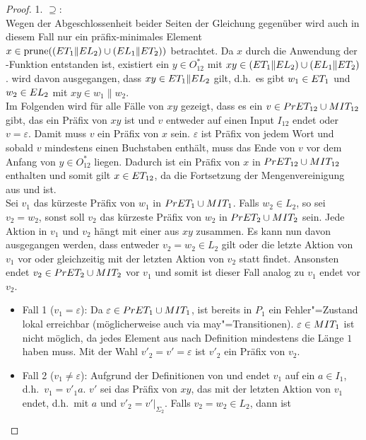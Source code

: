 \begin{proof}
  1. \glqq$\supseteq$\grqq{}:\\
  Wegen der Abgeschlossenheit beider Seiten der Gleichung gegenüber \cont{}
  wird auch in diesem Fall nur ein präfix-minimales Element $x\in\mathrm{prune} ((ET
  _1\|EL _2)\cup (EL _1\| ET _2))$ betrachtet. Da $x$ durch die Anwendung
  der \prune{}-Funktion entstanden ist, existiert ein $y\in O_{12} ^*$ mit
  $xy\in (ET _1\|EL _2)\cup (EL _1\| ET _2)$. \OBdA{} wird davon
  ausgegangen, dass $xy\in ET _1\| EL _2$ gilt, d.h.\ es gibt $w_1\in ET _1$
  und $w_2\in EL _2$ mit $xy \in w_1\| w_2$.\\
  Im Folgenden wird für alle Fälle von $xy$ gezeigt, dass es ein $v\in PrET
  _{12} \cup MIT _{12}$ gibt, das ein Präfix von $xy$ ist und $v$ entweder auf
  einen Input $I_{12}$ endet oder $v=\varepsilon$. Damit muss $v$ ein Präfix
  von $x$ sein. $\varepsilon$ ist Präfix von jedem Wort und sobald $v$
  mindestens einen Buchstaben enthält, muss das Ende von $v$ vor dem Anfang von
  $y\in O_{12}^*$ liegen. Dadurch ist ein Präfix von $x$ in $PrET _{12}\cup
  MIT _{12}$ enthalten und somit gilt $x\in ET _{12}$, da \ET{} die
  Fortsetzung der Mengenvereinigung aus \PrET{} und \MIT{} ist.\\
  Sei $v_1$ das kürzeste Präfix von $w_1$ in $PrET _1\cup MIT _1$. Falls $w_2
  \in L_2$, so sei $v_2=w_2$, sonst soll $v_2$ das kürzeste Präfix von $w_2$ in
  $PrET _2\cup MIT _2$ sein. Jede Aktion in $v_1$ und $v_2$ hängt mit einer
  aus $xy$ zusammen. Es kann nun davon ausgegangen werden, dass entweder $v_2 =
  w_2\in L_2$ gilt oder die letzte Aktion von $v_1$ vor oder gleichzeitig mit
  der letzten Aktion von $v_2$ statt findet. Ansonsten endet $v_2 \in PrET
  _2\cup MIT _2$ vor $v_1$ und somit ist dieser Fall analog zu $v_1$ endet vor
  $v_2$.
  \begin{itemize}
    \item Fall 1 ($v_1=\varepsilon$): Da $\varepsilon\in PrET _1\cup MIT _1$,
      ist bereits in $P_1$ ein Fehler"=Zustand lokal erreichbar
      (möglicherweise auch via may"=Transitionen). $\varepsilon \in MIT _1$
      ist nicht möglich, da jedes Element aus \MIT{} nach Definition mindestens
      die Länge $1$ haben muss. Mit der Wahl $v'_2=v'=\varepsilon$ ist $v'_2$
      ein Präfix von $v_2$.
    \item Fall 2 ($v_1\neq\varepsilon$): Aufgrund der Definitionen von \PrET{}
      und \MIT{} endet $v_1$ auf ein $a\in I_1$, d.h.\ $v_1=v'_1a$. $v'$ sei
      das Präfix von $xy$, das mit der letzten Aktion von $v_1$ endet, d.h.\
      mit $a$ und $v'_2=v'|_{\Sigma _2}$. Falls $v_2=w_2\in L_2$, dann ist

\end{itemize}
\end{proof}
